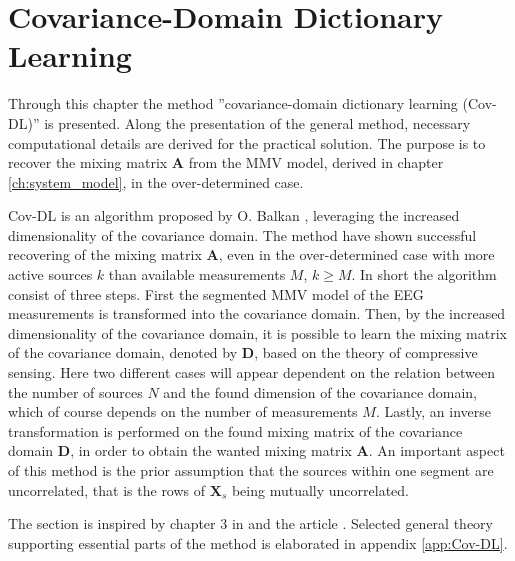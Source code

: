 \chapter{Covariance-Domain Dictionary Learning}\label{ch:Cov-DL}
Through this chapter the method ''covariance-domain dictionary learning (Cov-DL)'' is presented. Along the presentation of the general method, necessary computational details are derived for the practical solution.
The purpose is to recover the mixing matrix $\textbf{A}$ from the MMV model, derived in chapter \ref{ch:system_model}, in the over-determined case.   

Cov-DL is an algorithm proposed by O. Balkan \cite{Balkan2015}, leveraging the increased dimensionality of the covariance domain. The method have shown successful recovering of the mixing matrix $\textbf{A}$, even in the over-determined case with more active sources $k$ than available measurements $M$, $k \geq M$. 
In short the algorithm consist of three steps. 
First the segmented MMV model of the EEG measurements is transformed into the covariance domain. Then, by the increased dimensionality of the covariance domain, it is possible to learn the mixing matrix of the covariance domain, denoted by $\textbf{D}$, based on the theory of compressive sensing. Here two different cases will appear dependent on the relation between the number of sources $N$ and the found dimension of the covariance domain, which of course depends on the number of measurements $M$. Lastly, an inverse transformation is performed on the found mixing matrix of the covariance domain $\textbf{D}$, in order to obtain the wanted mixing matrix $\textbf{A}$. 
An important aspect of this method is the prior assumption that the sources within one segment are uncorrelated, that is the rows of $\textbf{X}_s$ being mutually uncorrelated. 

The section is inspired by chapter 3 in \cite{phd2015} and the article \cite{Balkan2015}. Selected general theory supporting essential parts of the method is elaborated in appendix \ref{app:Cov-DL}.


